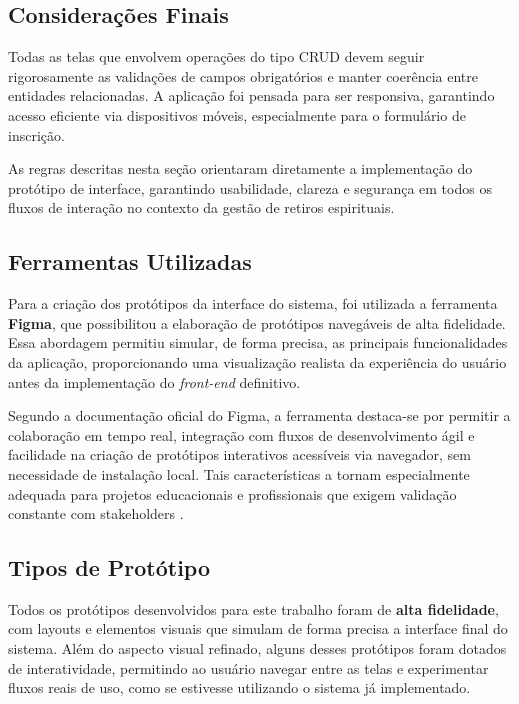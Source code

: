 \subsection{Considerações Finais}

Todas as telas que envolvem operações do tipo CRUD devem seguir rigorosamente as validações de campos obrigatórios e manter coerência entre entidades relacionadas. A aplicação foi pensada para ser responsiva, garantindo acesso eficiente via dispositivos móveis, especialmente para o formulário de inscrição.

As regras descritas nesta seção orientaram diretamente a implementação do protótipo de interface, garantindo usabilidade, clareza e segurança em todos os fluxos de interação no contexto da gestão de retiros espirituais.

\subsection{Ferramentas Utilizadas}

Para a criação dos protótipos da interface do sistema, foi utilizada a ferramenta \textbf{Figma}, que possibilitou a elaboração de protótipos navegáveis de alta fidelidade. Essa abordagem permitiu simular, de forma precisa, as principais funcionalidades da aplicação, proporcionando uma visualização realista da experiência do usuário antes da implementação do \textit{front-end} definitivo.

Segundo a documentação oficial do Figma, a ferramenta destaca-se por permitir a colaboração em tempo real, integração com fluxos de desenvolvimento ágil e facilidade na criação de protótipos interativos acessíveis via navegador, sem necessidade de instalação local. Tais características a tornam especialmente adequada para projetos educacionais e profissionais que exigem validação constante com stakeholders \cite{figma_docs}.

\subsection{Tipos de Protótipo}

Todos os protótipos desenvolvidos para este trabalho foram de \textbf{alta fidelidade}, com layouts e elementos visuais que simulam de forma precisa a interface final do sistema. Além do aspecto visual refinado, alguns desses protótipos foram dotados de interatividade, permitindo ao usuário navegar entre as telas e experimentar fluxos reais de uso, como se estivesse utilizando o sistema já implementado.

